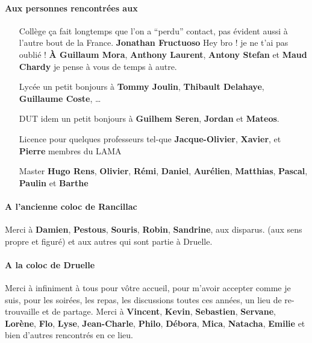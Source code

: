 \documentclass[../thesis.tex]{subfiles}
\begin{document}
\paragraph{Aux personnes rencontrées aux}

\begin{itemize}
	\item[Collège] ça fait longtemps que l'on a ``perdu'' contact, pas évident aussi à l'autre bout de la France.
	\textbf{Jonathan Fructuoso} Hey bro ! je ne t'ai pas oublié ! \textbf{À Guillaum Mora}, \textbf{Anthony Laurent}, \textbf{Antony Stefan}
	et \textbf{Maud Chardy} je pense à vous de temps à autre.
	
	\item[Lycée] un petit bonjours à \textbf{Tommy Joulin}, \textbf{Thibault Delahaye}, \textbf{Guillaume Coste}, \dots
	
	\item[DUT] idem un petit bonjours à \textbf{Guilhem Seren}, \textbf{Jordan} et \textbf{Mateos}.
	
	\item[Licence] pour quelques professeurs tel-que \textbf{Jacque-Olivier}, \textbf{Xavier}, et \textbf{Pierre} membres du LAMA
	
	\item[Master] \textbf{Hugo Rens}, \textbf{Olivier}, \textbf{Rémi}, \textbf{Daniel}, \textbf{Aurélien},
	\textbf{Matthias}, \textbf{Pascal}, \textbf{Paulin} et \textbf{Barthe}
\end{itemize}

\paragraph{A l'ancienne coloc de Rancillac} Merci à \textbf{Damien}, \textbf{Pestous}, \textbf{Souris}, \textbf{Robin}, \textbf{Sandrine}, aux disparus.
(aux sens propre et figuré) et aux autres qui sont partie à Druelle.

\paragraph{A la coloc de Druelle} Merci à infiniment à tous pour vôtre accueil,
pour m'avoir accepter comme je suis, pour les soirées, les repas, les discussions toutes ces années, un lieu de re-trouvaille et de partage.
Merci à \textbf{Vincent}, \textbf{Kevin}, \textbf{Sebastien}, \textbf{Servane}, \textbf{Lorène}, \textbf{Flo}, \textbf{Lyse}, \textbf{Jean-Charle},
\textbf{Philo}, \textbf{Débora}, \textbf{Mica}, \textbf{Natacha}, \textbf{Emilie} et bien d'autres rencontrés en ce lieu.
\end{document}
